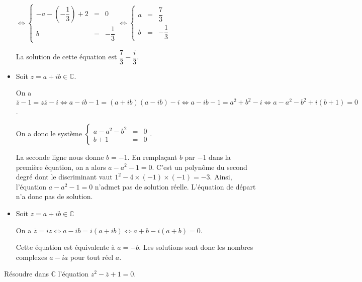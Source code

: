 \documentclass[11pt,fleqn, openany]{book} %
\begin{document}
\begin{solution}
\begin{itemize}
\( \Leftrightarrow \left\{\begin{array}{rcl}-a-\left(-\dfrac{1}{3}\right)+2&=&0 \\ b &=& - \dfrac{1}{3} \end{array}\right.\Leftrightarrow \left\{\begin{array}{rcl} a &=& \dfrac{7}{3} \\ b &=& - \dfrac{1}{3} \end{array}\right.\)

La solution de cette équation est \(\dfrac{7}{3}-\dfrac{i}{3}\).
\vskip5pt
\item Soit \(z=a+ib\in\mathbb{C}\). 

On a  \(\overline{z}-1=z\overline{z}-i \Leftrightarrow a-ib-1=(a+ib)(a-ib)-i \Leftrightarrow a-ib-1=a^2+b^2-i \Leftrightarrow a-a^2-b^2 +i(b+1)=0\).

On a donc le système  \(\left\{\begin{array}{rcl}a-a^2-b^2&=&0 \\ b+1 &=&0\end{array}\right.\).

La seconde ligne nous donne \(b=-1\). En remplaçant \(b\) par \(-1\) dans la première équation, on a alors \(a-a^2-1=0\). C'est un polynôme du second degré dont le discriminant vaut \(1^2-4\times(-1) \times (-1) = -3\). Ainsi, l'équation \(a-a^2-1=0\) n'admet pas de solution réelle. L'équation de départ n'a donc pas de solution.
\vskip5pt
\item Soit \(z=a+ib\in\mathbb{C}\) 

On a \(\overline{z}=iz \Leftrightarrow a-ib = i(a+ib) \Leftrightarrow a+b -i(a+b)=0\).

Cette équation est équivalente à \(a=-b\). Les solutions sont donc les nombres complexes \(a-ia\) pour tout réel \(a\).
\end{itemize}
\end{solution}


\begin{exercise}[topic=cpx02]Résoudre dans $\mathbb{C}$ l'équation $z^2-\overline{z}+1=0$.\end{exercise}
\end{document}
